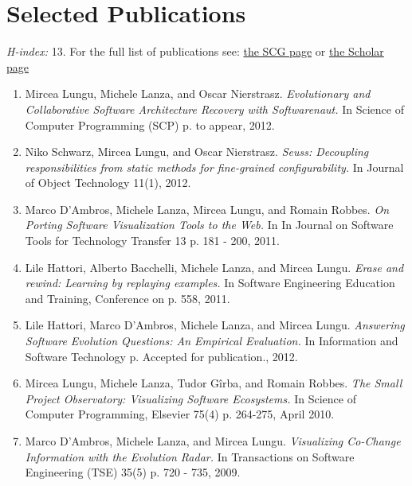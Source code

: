 \section{Selected Publications}

\emph{H-index:} 13.
For the full list of publications see: \href{http://scg.unibe.ch/staff/mircea/pubs}{the SCG page} or \href{http://scholar.google.ch/citations?user=7zx6Cg0AAAAJ}{the Scholar page}



\begin{enumerate}

\item Mircea Lungu, Michele Lanza, and Oscar Nierstrasz. \emph{Evolutionary and Collaborative Software Architecture Recovery with Softwarenaut.} In Science of Computer Programming (SCP) p. to appear, 2012.

\item Niko Schwarz, Mircea Lungu, and Oscar Nierstrasz. \emph{Seuss: Decoupling responsibilities from static methods for fine-grained configurability.} In Journal of Object Technology 11(1), 2012.

\item Marco D'Ambros, Michele Lanza, Mircea Lungu, and Romain Robbes. \emph{On Porting Software Visualization Tools to the Web.} In In Journal on Software Tools for Technology Transfer 13 p. 181 - 200, 2011.

\item Lile Hattori, Alberto Bacchelli, Michele Lanza, and Mircea Lungu. \emph{Erase and rewind: Learning by replaying examples.} In Software Engineering Education and Training, Conference on p. 558, 2011.

\item Lile Hattori, Marco D'Ambros, Michele Lanza, and Mircea Lungu. \emph{Answering Software Evolution Questions: An Empirical Evaluation.} In Information and Software Technology p. Accepted for publication., 2012.

\item Mircea Lungu, Michele Lanza, Tudor G\^irba, and Romain Robbes. \emph{The Small Project Observatory: Visualizing Software Ecosystems.} In Science of Computer Programming, Elsevier 75(4) p. 264-275, April 2010.

\item Marco D'Ambros, Michele Lanza, and Mircea Lungu. \emph{Visualizing Co-Change Information with the Evolution Radar.} In Transactions on Software Engineering (TSE) 35(5) p. 720 - 735, 2009.
\end{enumerate}